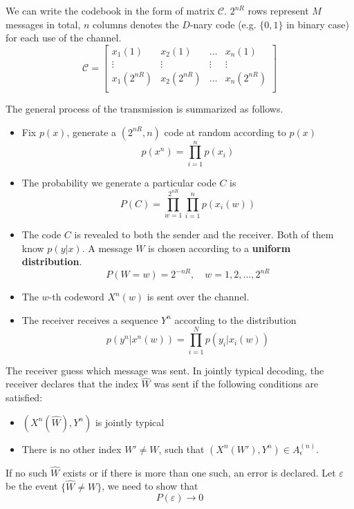 \documentclass[10pt,landscape, a4paper]{article}
\begin{document}
\begin{multicols}{3}
We can write the codebook in the form of matrix $\mathcal{C}$. $2^{nR}$ rows represent $M$ messages in total, $n$ columns denotes the $D$-nary code (e.g. $\{0,1\}$ in binary case) for each use of the channel.
$$
    \mathcal{C}=\begin{bmatrix}
        x_1(1) & x_2(1) & \dots & x_n(1)\\
        \vdots & \vdots & \vdots & \vdots \\
        x_1(2^{nR}) & x_2(2^{nR}) & \dots & x_n(2^{nR})\\
    \end{bmatrix}
$$

The general process of the transmission is summarized as follows.
\begin{itemize}
    \item Fix $p(x)$, generate a $(2^{nR},n)$ code at random according to $p(x)$
    $$
    p(x^n)=\prod_{i=1}^n p(x_i)
    $$
  
    \item The probability we generate a particular code $C$ is
    $$
    P(C)=\prod_{w=1}^{2^{nR}}\prod_{i=1}^np(x_i(w))
    $$
  
    \item The code $C$ is revealed to both the sender and the receiver. Both of them know $p(y|x)$. A message $W$ is chosen according to a \textbf{uniform distribution}.
    $$
    P(W=w)=2^{-nR}, \quad w=1,2,\dots, 2^{nR}
    $$
  
    \item The $w$-th codeword $X^n(w)$ is sent over the channel.
  
    \item The receiver receives a sequence $Y^n$ according to the distribution
    $$
    p(y^n|x^n(w))=\prod_{i=1}^N p(y_i|x_i(w))
    $$

\end{itemize}

The receiver guess which message was sent. In jointly typical decoding, the receiver declares that the index $\widehat{W}$ was sent if the following conditions are satisfied:

\begin{itemize}
    \item $(X^n(\hat{W}),Y^n)$ is jointly typical
    \item There is no other index $W'\ne W$, such that $(X^n(W'),Y^n)\in A_\epsilon^{(n)}$.
\end{itemize}

If no such $\widehat{W}$ exists or if there is more than one such, an error is declared. Let $\varepsilon$ be the event $\{\hat{W}\ne W\}$, we need to show that
$$
P(\varepsilon)\rightarrow 0
$$


\end{multicols}
\end{document}
